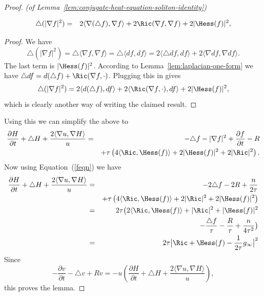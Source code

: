 \begin{proof}{\em (of Lemma~\ref{lem:conjugate-heat-equation-soliton-identity})}
\begin{claim}\label{claim:laplacian-gradient-squared-formula}
\begin{eqnarray*} \triangle(|\nabla f|^2) & = &
2\langle\nabla(\triangle f),\nabla f\rangle+2\Ric(\nabla
f,\nabla f)+2|\Hess(f)|^2,
\end{eqnarray*}
\end{claim}

\begin{proof}
We have
$$\triangle(|\nabla f|^2)=\triangle \langle \nabla f,\nabla f\rangle =\triangle \langle df,df\rangle=2\langle \triangle
df,df\rangle+2\langle \nabla df,\nabla df\rangle.$$ The last term is
$|\Hess(f)|^2$. According to Lemma~\ref{lem:laplacian-one-form} we have
$\triangle df=d(\triangle f)+\Ric(\nabla f,\cdot)$. Plugging
this in gives
$$\triangle(|\nabla f|^2)=2\langle d(\triangle f),df\rangle+2\langle
\Ric(\nabla f,\cdot),df\rangle+2|\Hess(f)|^2,$$ which is
clearly another way of writing the claimed result.
\end{proof}


Using this we can simplify the above to
\begin{eqnarray*}
\frac{\partial H}{\partial t} +\triangle H+\frac{2\langle\nabla
u,\nabla H\rangle}{u} & = &-\triangle f-|\nabla f|^2+\frac{\partial
f}{\partial t}-R
\\
& & +\tau\left(4\langle \Ric,\Hess(f)\rangle +2|\Hess(f)|^2+2|\Ric|^2\right).
\end{eqnarray*}
Now using Equation~(\ref{feqn}) we have
\begin{eqnarray*}
\frac{\partial H}{\partial t} +\triangle H+\frac{2\langle\nabla
u,\nabla H\rangle}{u} & = &
-2\triangle f-2R+\frac{n}{2\tau} \\
& & +\tau\left(4\langle \Ric,\Hess(f)\rangle+2|\Ric|^2+2|\Hess(f)|^2\right) \\
& = & 2\tau\bigl(2\langle \Ric,\Hess(f)\rangle+|\Ric|^2+|\Hess(f)|^2\bigr. \\
& & -\frac{\triangle f}{\tau}-\frac{R}{\tau}+\frac{n}{4\tau^2}\bigr) \\
& = & 2\tau\bigl|\Ric+
\Hess(f)-\frac{1}{2\tau}g_\infty\bigr|^2
\end{eqnarray*}
Since
$$-\frac{\partial v}{\partial t}-\triangle v+Rv=-u\left(\frac{\partial H}{\partial t}
 +\triangle H+\frac{2\langle\nabla u,\nabla H\rangle}{u}\right),$$
 this proves the lemma.
\end{proof}



